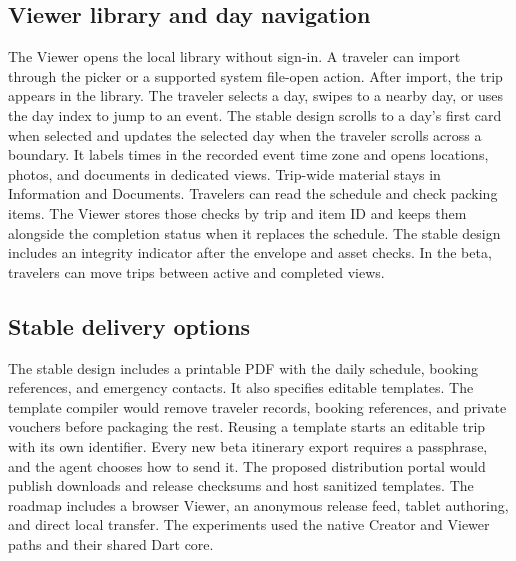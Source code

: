 \subsection{Viewer library and day navigation}
The Viewer opens the local library without sign-in. A traveler can import through the picker or a supported system file-open action. After import, the trip appears in the library. The traveler selects a day, swipes to a nearby day, or uses the day index to jump to an event. The stable design scrolls to a day's first card when selected and updates the selected day when the traveler scrolls across a boundary. It labels times in the recorded event time zone and opens locations, photos, and documents in dedicated views. Trip-wide material stays in Information and Documents. Travelers can read the schedule and check packing items. The Viewer stores those checks by trip and item ID and keeps them alongside the completion status when it replaces the schedule. The stable design includes an integrity indicator after the envelope and asset checks. In the beta, travelers can move trips between active and completed views.

\subsection{Stable delivery options}
The stable design includes a printable PDF with the daily schedule, booking references, and emergency contacts. It also specifies editable templates. The template compiler would remove traveler records, booking references, and private vouchers before packaging the rest. Reusing a template starts an editable trip with its own identifier. Every new beta itinerary export requires a passphrase, and the agent chooses how to send it. The proposed distribution portal would publish downloads and release checksums and host sanitized templates. The roadmap includes a browser Viewer, an anonymous release feed, tablet authoring, and direct local transfer. The experiments used the native Creator and Viewer paths and their shared Dart core.
